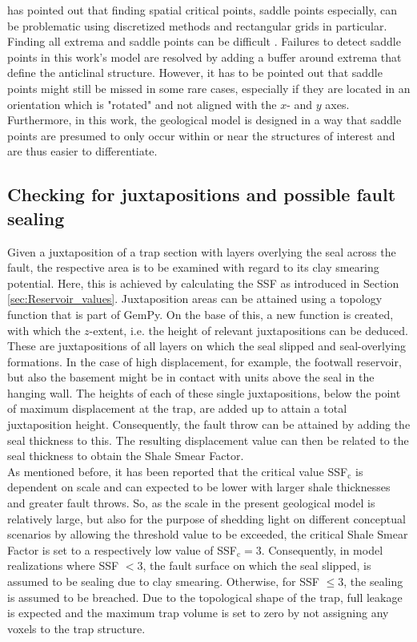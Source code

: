 			\citet{kuijper2004detecting} has pointed out that finding spatial critical points, saddle points especially, can be problematic using discretized methods and rectangular grids in particular. Finding all extrema and saddle points can be difficult \citep{kuijper2004detecting}. Failures to detect saddle points in this work's model are resolved by adding a buffer around extrema that define the anticlinal structure. However, it has to be pointed out that saddle points might still be missed in some rare cases, especially if they are located in an orientation which is "rotated" and not aligned with the $x$- and $y$ axes. Furthermore, in this work, the geological model is designed in a way that saddle points are presumed to only occur within or near the structures of interest and are thus easier to differentiate.
						
			\subsection{Checking for juxtapositions and possible fault sealing}\label{sec:check_juxta}
			Given a juxtaposition of a trap section with layers overlying the seal across the fault, the respective area is to be examined with regard to its clay smearing potential. Here, this is achieved by calculating the SSF as introduced in Section \ref{sec:Reservoir_values}. Juxtaposition areas can be attained using a topology function that is part of GemPy. On the base of this, a new function is created, with which the $z$-extent, i.e. the height of relevant juxtapositions can be deduced. These are juxtapositions of all layers on which the seal slipped and seal-overlying formations. In the case of high displacement, for example, the footwall reservoir, but also the basement might be in contact with units above the seal in the hanging wall. The  heights of each of these single juxtapositions, below the point of maximum displacement at the trap, are added up to attain a total juxtaposition height. Consequently, the fault throw can be attained by adding the seal thickness to this. The resulting displacement value can then be related to the seal thickness to obtain the Shale Smear Factor.\\
			As mentioned before, it has been reported that the critical value SSF$_\text{c}$ is dependent on scale and can expected to be lower with larger shale thicknesses and greater fault throws. So, as the scale in the present geological model is relatively large, but also for the purpose of shedding light on different conceptual scenarios by allowing the threshold value to be exceeded, the critical Shale Smear Factor is set to a respectively low value of SSF$_\text{c} = 3$. Consequently, in model realizations where SSF $< 3$, the fault surface on which the seal slipped, is assumed to be sealing due to clay smearing. Otherwise, for SSF $\le 3$, the sealing is assumed to be breached. Due to the topological shape of the trap, full leakage is expected and the maximum trap volume is set to zero by not assigning any voxels to the trap structure.
						
